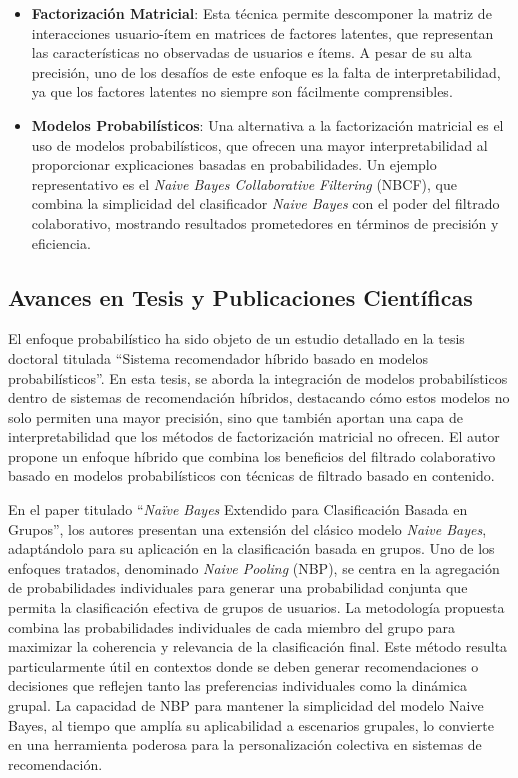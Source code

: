 \documentclass[runningheads,a4paper]{llncs}
\begin{document}
\begin{itemize}
    \item \textbf{Factorización Matricial}: Esta técnica permite descomponer la matriz de interacciones usuario-ítem en matrices de factores latentes, que representan las características no observadas de usuarios e ítems. A pesar de su alta precisión, uno de los desafíos de este enfoque es la falta de interpretabilidad, ya que los factores latentes no siempre son fácilmente comprensibles.\cite{tesis_sistema_recomendador_hibrido}

    \item \textbf{Modelos Probabilísticos}: Una alternativa a la factorización matricial es el uso de modelos probabilísticos, que ofrecen una mayor interpretabilidad al proporcionar explicaciones basadas en probabilidades. Un ejemplo representativo es el \textit{Naive Bayes Collaborative Filtering} (NBCF), que combina la simplicidad del clasificador \textit{Naive Bayes} con el poder del filtrado colaborativo, mostrando resultados prometedores en términos de precisión y eficiencia.\cite{tesis_sistema_recomendador_hibrido}
\end{itemize}

\subsection{Avances en Tesis y Publicaciones Científicas}

El enfoque probabilístico ha sido objeto de un estudio detallado en la tesis doctoral titulada 
``Sistema recomendador híbrido basado en modelos probabilísticos''\cite{tesis_sistema_recomendador_hibrido}. En esta tesis, se aborda la integración de modelos probabilísticos dentro de sistemas de recomendación híbridos, destacando cómo estos modelos no solo permiten una mayor precisión, sino que también aportan una capa de interpretabilidad que los métodos de factorización matricial no ofrecen. El autor propone un enfoque híbrido que combina los beneficios del filtrado colaborativo basado en modelos probabilísticos con técnicas de filtrado basado en contenido.

En el paper titulado ``\textit{Naïve 
Bayes} Extendido para Clasificación Basada en Grupos''\cite{nbp}, los autores presentan una extensión del clásico modelo \textit{Naive Bayes}, adaptándolo para su aplicación en la clasificación basada en grupos. Uno de los enfoques tratados, denominado \textit{Naive Pooling} (NBP), se centra en la agregación de probabilidades individuales para generar una probabilidad conjunta que permita la clasificación efectiva de grupos de usuarios. La metodología propuesta combina las probabilidades individuales de cada miembro del grupo para maximizar la coherencia y relevancia de la clasificación final. Este método resulta particularmente útil en contextos donde se deben generar recomendaciones o decisiones que reflejen tanto las preferencias individuales como la dinámica grupal. La capacidad de NBP para mantener la simplicidad del modelo Naive Bayes, al tiempo que amplía su aplicabilidad a escenarios grupales, lo convierte en una herramienta poderosa para la personalización colectiva en sistemas de recomendación.
\end{document}
